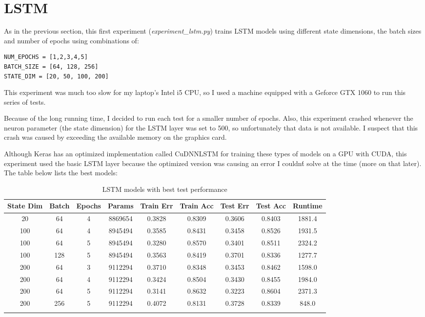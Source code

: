 \documentclass[letterpaper, 10pt]{article}
\begin{document}
\section{LSTM}

As in the previous section, this first experiment ({\em experiment\_lstm.py}) trains
LSTM models using different state dimensions, the batch sizes and number of epochs using combinations of:

\begin{verbatim}
NUM_EPOCHS = [1,2,3,4,5]
BATCH_SIZE = [64, 128, 256]
STATE_DIM = [20, 50, 100, 200]
\end{verbatim}

This experiment was much too slow for my laptop's Intel i5 CPU, so I used a machine
 equipped with a Geforce GTX 1060 to run this series of tests.

Because of the long running time, I decided to run each test
for a smaller number of epochs. Also, this experiment crashed whenever
the neuron parameter (the state dimension) for the LSTM layer was set to 500, so
unfortunately that data is not available. I suspect that this crash was
caused by exceeding the available memory on the graphics card.

Although Keras has an optimized implementation
called CuDNNLSTM for training these types of models on a GPU with CUDA,
this experiment used the basic LSTM layer because the optimized version
was causing an error I couldn\'t solve at the time (more on that later).
The table below lists the best models:

\newpage

\begin{longtable}{c | c | c | c | c | c | c | c | c}
State Dim & Batch & Epochs & Params & Train Err & Train Acc & Test Err & Test Acc & Runtime\\
\hline
\endhead
20 & 64 & 4 & 8869654 & 0.3828 & 0.8309 & 0.3606 & 0.8403 & 1881.4 \\
100 & 64 & 4 & 8945494 & 0.3585 & 0.8431 & 0.3458 & 0.8526 & 1931.5 \\
100 & 64 & 5 & 8945494 & 0.3280 & 0.8570 & 0.3401 & 0.8511 & 2324.2 \\
100 & 128 & 5 & 8945494 & 0.3563 & 0.8419 & 0.3701 & 0.8336 & 1277.7 \\
200 & 64 & 3 & 9112294 & 0.3710 & 0.8348 & 0.3453 & 0.8462 & 1598.0 \\
200 & 64 & 4 & 9112294 & 0.3424 & 0.8504 & 0.3430 & 0.8455 & 1984.0 \\
200 & 64 & 5 & 9112294 & 0.3141 & 0.8632 & 0.3223 & 0.8604 & 2371.3 \\
200 & 256 & 5 & 9112294 & 0.4072 & 0.8131 & 0.3728 & 0.8339 & 848.0 \\
\caption{LSTM models with best test performance}
\label{tab:resultslstm}
\end{longtable}
\end{document}
